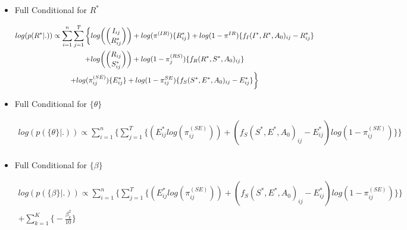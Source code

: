 \documentclass[12pt]{article}
\begin{document}
\begin{itemize}
    \item{Full Conditional for $R^*$}
    \begin{center}
    \begin{multline}
        \displaystyle
        log(p(R^*|.)) \propto \sum_{i=1}^n\sum_{j=1}^T\bigg\{log\bigg(\dbinom{I_{ij}}{R^*_{ij}}\bigg) + log(\pi^{(IR)})\{R^*_{ij}\}
            + log(1-\pi^{IR})\{f_I(I^*, R^*, A_0)_{ij} - R^*_{ij}\}\\
            + log\bigg(\dbinom{R_{ij}}{S^*_{ij}}\bigg) + log(1-\pi_j^{(RS)})\{f_R(R^*, S^*, A_0)_{ij}\}\\ 
            + log(\pi_{ij}^{(SE)})\{E^*_{ij}\} + log(1-\pi_{ij}^{SE})\{f_S(S^*, E^*, A_0)_{ij} - E^*_{ij}\}\bigg\}\\ 
    \end{multline}
    \end{center}
    \item{Full Conditional for $\{\theta\}$}
    \begin{center}
    \begin{multline}
        \displaystyle
        log(p(\{\theta\}|.)) \propto \sum_{i=1}^n \bigg\{ \sum_{j=1}^T\Big\{
            (E^*_{ij}log(\pi_{ij}^{(SE)})) + (f_S(S^*, E^*, A_0)_{ij} - E^*_{ij})log(1-\pi_{ij}^{(SE)})\Big\}\bigg\} \\
    \end{multline}
    \end{center}

    \item{Full Conditional for $\{\beta\}$}
    \begin{center}
    \begin{multline}
        \displaystyle
        log(p(\{\beta\}|.)) \propto
            \sum_{i=1}^n \bigg\{ \sum_{j=1}^T\Big\{
            (E^*_{ij}log(\pi_{ij}^{(SE)})) + (f_S(S^*, E^*, A_0)_{ij} - E^*_{ij})log(1-\pi_{ij}^{(SE)})\Big\}\bigg\} \\
             + \sum_{k = 1}^K\bigg\{-\frac{\beta^2_k}{10}\bigg\}
    \end{multline}
    \end{center}


\end{itemize}
\end{document}
